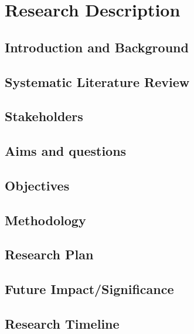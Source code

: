\chapter{Research Description}\label{ch:Intro}

\section{Introduction and Background}\label{sec:disBackground}


\section{Systematic Literature Review}\label{sec:disSLR}




\section{Stakeholders}\label{sec:disStakeholders}


\section{Aims and questions}\label{sec:disAims}


\section{Objectives}\label{sec:disObjectives}


\section{Methodology}\label{sec:disMethodology}


\section{Research Plan}\label{sec:disResearchPlan}


\section{Future Impact/Significance}\label{sec:disFutureImpact}


\pagebreak

\section{Research Timeline}\label{sec:disResearchTimeline}














